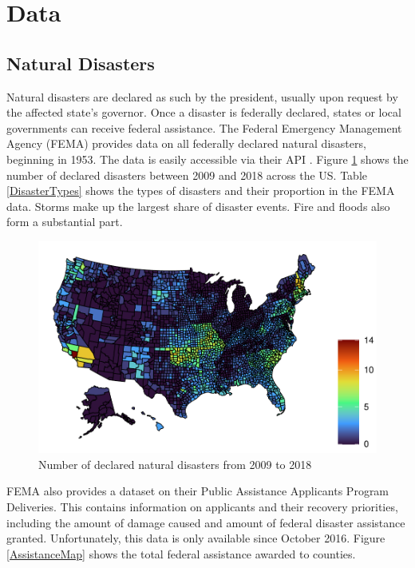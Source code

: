 
\section{Data} \label{Data}

\subsection{Natural Disasters}

Natural disasters are declared as such by the president, usually upon request by the affected state's governor. Once a disaster is federally declared, states or local governments can receive federal assistance. The Federal Emergency Management Agency (FEMA) provides data on all federally declared natural disasters, beginning in 1953. The data is easily accessible via their API \citep{rfema}. Figure \ref{DisasterMap} shows the number of declared disasters between 2009 and 2018 across the US. Table \ref{DisasterTypes} shows the types of disasters and their proportion in the FEMA data. Storms make up the largest share of disaster events. Fire and floods also form a substantial part.

\begin{figure}[!h]
	\centering
	\includegraphics[scale=1]{"../Code & Data/DisasterMap.pdf"}
	\caption{Number of declared natural disasters from 2009 to 2018}
	\label{DisasterMap}
\end{figure}



FEMA also provides a dataset on  their Public Assistance Applicants Program Deliveries. This contains information on applicants and their recovery priorities, including the amount of damage caused and amount of federal disaster assistance granted. Unfortunately, this data is only available since October 2016. Figure \ref{AssistanceMap} shows the total federal assistance awarded to counties.

